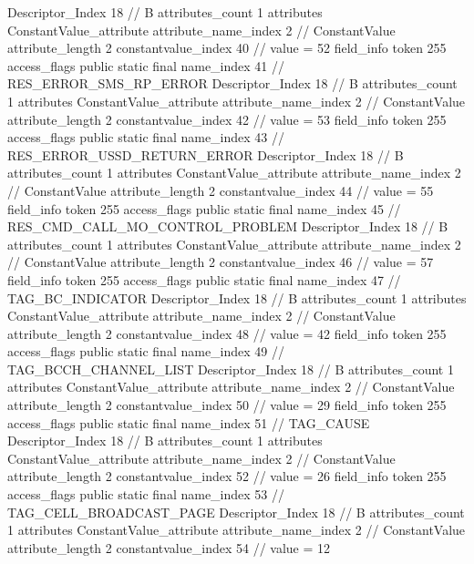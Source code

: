 {{{{{				Descriptor_Index	18		// B
				attributes_count	1
				attributes {
				ConstantValue_attribute {
					attribute_name_index	2		// ConstantValue
					attribute_length	2
					constantvalue_index	40		// value = 52
				}
				}
			}
			field_info {
				token	255
				access_flags	public static final
				name_index	41		// RES_ERROR_SMS_RP_ERROR
				Descriptor_Index	18		// B
				attributes_count	1
				attributes {
				ConstantValue_attribute {
					attribute_name_index	2		// ConstantValue
					attribute_length	2
					constantvalue_index	42		// value = 53
				}
				}
			}
			field_info {
				token	255
				access_flags	public static final
				name_index	43		// RES_ERROR_USSD_RETURN_ERROR
				Descriptor_Index	18		// B
				attributes_count	1
				attributes {
				ConstantValue_attribute {
					attribute_name_index	2		// ConstantValue
					attribute_length	2
					constantvalue_index	44		// value = 55
				}
				}
			}
			field_info {
				token	255
				access_flags	public static final
				name_index	45		// RES_CMD_CALL_MO_CONTROL_PROBLEM
				Descriptor_Index	18		// B
				attributes_count	1
				attributes {
				ConstantValue_attribute {
					attribute_name_index	2		// ConstantValue
					attribute_length	2
					constantvalue_index	46		// value = 57
				}
				}
			}
			field_info {
				token	255
				access_flags	public static final
				name_index	47		// TAG_BC_INDICATOR
				Descriptor_Index	18		// B
				attributes_count	1
				attributes {
				ConstantValue_attribute {
					attribute_name_index	2		// ConstantValue
					attribute_length	2
					constantvalue_index	48		// value = 42
				}
				}
			}
			field_info {
				token	255
				access_flags	public static final
				name_index	49		// TAG_BCCH_CHANNEL_LIST
				Descriptor_Index	18		// B
				attributes_count	1
				attributes {
				ConstantValue_attribute {
					attribute_name_index	2		// ConstantValue
					attribute_length	2
					constantvalue_index	50		// value = 29
				}
				}
			}
			field_info {
				token	255
				access_flags	public static final
				name_index	51		// TAG_CAUSE
				Descriptor_Index	18		// B
				attributes_count	1
				attributes {
				ConstantValue_attribute {
					attribute_name_index	2		// ConstantValue
					attribute_length	2
					constantvalue_index	52		// value = 26
				}
				}
			}
			field_info {
				token	255
				access_flags	public static final
				name_index	53		// TAG_CELL_BROADCAST_PAGE
				Descriptor_Index	18		// B
				attributes_count	1
				attributes {
				ConstantValue_attribute {
					attribute_name_index	2		// ConstantValue
					attribute_length	2
					constantvalue_index	54		// value = 12
}}}}}}}
